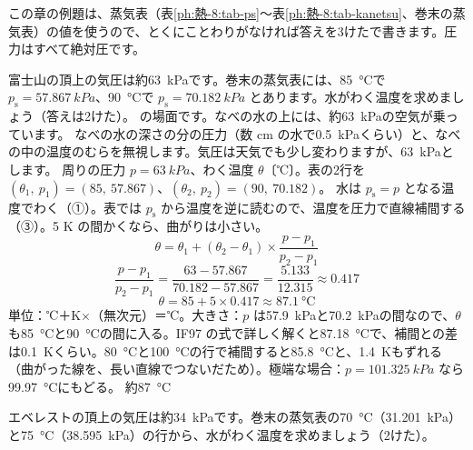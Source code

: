 
\noindent この章の例題は、蒸気表（表\ref{ph:熱-8:tab-ps}〜表\ref{ph:熱-8:tab-kanetsu}、巻末の蒸気表）の値を使うので、とくにことわりがなければ答えを3けたで書きます。圧力はすべて絶対圧です。

\begin{phreidai}
\label{ph:熱-8:ex1}富士山の頂上の気圧は約\qty{63}{kPa}です。巻末の蒸気表には、\qty{85}{\celsius}で $p_{\mathrm s}=\qty{57.867}{kPa}$、\qty{90}{\celsius}で $p_{\mathrm s}=\qty{70.182}{kPa}$ とあります。水がわく温度を求めましょう（答えは2けた）。
\phbamen
\bkhatenaref の場面です。なべの水の上には、約\qty{63}{kPa}の空気が乗っています。
\phmushi
なべの水の深さの分の圧力（数 cm の水で\qty{0.5}{kPa}くらい）と、なべの中の温度のむらを無視します。気圧は天気でも少し変わりますが、\qty{63}{kPa}とします。
\phzu
周りの圧力 $p=\qty{63}{kPa}$、わく温度 $\theta$〔℃〕。表の2行を $(\theta_1,\ p_1)=(85,\ 57.867)$、$(\theta_2,\ p_2)=(90,\ 70.182)$。
\phriyu
水は $p_{\mathrm s}=p$ となる温度でわく（①）。表では $p_{\mathrm s}$ から温度を逆に読むので、温度を圧力で直線補間する（③）。5 K の間かくなら、曲がりは小さい。
\phtateru
\[ \theta=\theta_1+(\theta_2-\theta_1)\times\frac{p-p_1}{p_2-p_1} \]
\phtoku
\[ \frac{p-p_1}{p_2-p_1}=\frac{63-57.867}{70.182-57.867}=\frac{5.133}{12.315}\approx0.417 \]
\[ \theta=85+5\times0.417\approx\qty{87.1}{\celsius} \]
\phtashikame
単位：℃＋K×（無次元）＝℃。大きさ：$p$ は\qty{57.9}{kPa}と\qty{70.2}{kPa}の間なので、$\theta$ も\qty{85}{\celsius}と\qty{90}{\celsius}の間に入る。IF97 の式で詳しく解くと\qty{87.18}{\celsius}で、補間との差は\qty{0.1}{K}くらい。\qty{80}{\celsius}と\qty{100}{\celsius}の行で補間すると\qty{85.8}{\celsius}と、\qty{1.4}{K}もずれる（曲がった線を、長い直線でつないだため）。極端な場合：$p=\qty{101.325}{kPa}$ なら\qty{99.97}{\celsius}にもどる。
\kotae 約\qty{87}{\celsius}
\end{phreidai}
\begin{jibun}
エベレストの頂上の気圧は約\qty{34}{kPa}です。巻末の蒸気表の\qty{70}{\celsius}（\qty{31.201}{kPa}）と\qty{75}{\celsius}（\qty{38.595}{kPa}）の行から、水がわく温度を求めましょう（2けた）。
\end{jibun}

